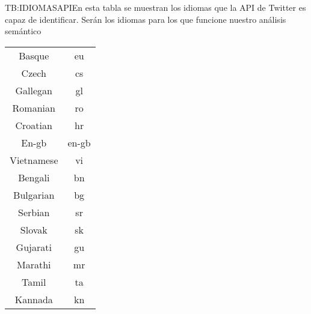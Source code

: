 \begin{table}[Idiomas soportados por la API de Twitter]{TB:IDIOMASAPI}{En esta tabla se muestran los idiomas que la API de Twitter es capaz de identificar. Serán los idiomas para los que funcione nuestro análisis semántico}
{\begin{tabular}{|c|c|}
		Basque & eu\\ 
		Czech & cs\\ 
		Gallegan & gl\\ 
		Romanian & ro\\ 
		Croatian & hr\\ 
		En-gb & en-gb\\ 
		Vietnamese & vi\\ 
		Bengali & bn\\ 
		Bulgarian & bg\\ 
		Serbian & sr\\ 
		Slovak & sk\\ 
		Gujarati & gu\\ 
		Marathi & mr\\ 
		Tamil & ta\\ 
		Kannada & kn\\
		\hline \hline
		\hline
		\end{tabular}
	}

\end{table}
